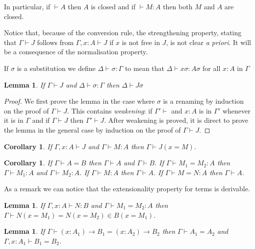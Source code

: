\documentclass[11pt]{article}
\newtheorem{lemma}[theorem]{Lemma}
\newtheorem{corollary}[theorem]{Corollary}
\begin{document}
 In particular, if $\vdash A$ then $A$ is closed and if $\vdash M:A$ then both $M$ and
$A$ are closed.


 Notice that, because of the conversion rule, the strengthening property, stating that
$\Gamma\vdash J$ follows from $\Gamma,x{:}A\vdash J$ if $x$ is not free in $J$, is not
clear {\em a priori}. It will be a consequence of the normalisation property. 


 If $\sigma$ is a substitution we define $\Delta\vdash\sigma:\Gamma$ to mean that $\Delta\vdash x\sigma:A\sigma$ for
all $x{:}A$ in $\Gamma$

\begin{lemma}
If $\Gamma\vdash J$ and $\Delta\vdash\sigma:\Gamma$ then $\Delta\vdash J\sigma$
\end{lemma}

\begin{proof}
We first prove the lemma in the case where $\sigma$ is a renaming by induction on
the proof of $\Gamma\vdash J$.
This contains {\em weakening}: if $\Gamma'\vdash$ and $x{:}A$ is in $\Gamma'$ whenever it is in
$\Gamma$ and if $\Gamma\vdash J$ then $\Gamma'\vdash J$. After weakening is proved, it is
direct to prove the lemma in the general case by induction on
the proof of $\Gamma\vdash J$.
\end{proof}


\begin{corollary}
If $\Gamma,x{:}A\vdash J$ and $\Gamma\vdash M:A$
then $\Gamma\vdash J(x=M)$.
\end{corollary}



\begin{corollary}
If $\Gamma\vdash A=B$ then $\Gamma\vdash A$ and $\Gamma\vdash B$. If $\Gamma\vdash M_1=M_2:A$ then
$\Gamma\vdash M_1:A$ and $\Gamma\vdash M_2:A$. If $\Gamma\vdash M:A$
then $\Gamma\vdash A$. If
$\Gamma\vdash M=N:A$ then $\Gamma\vdash A$.
\end{corollary}

 As a remark we can notice that the extensionality property for terms is derivable.

\begin{lemma}
If $\Gamma,x{:}A\vdash N:B$ and $\Gamma\vdash M_1=M_2:A$ then
$\Gamma\vdash N(x=M_1) = N(x=M_2)\in B(x=M_1)$.
\end{lemma}

\begin{lemma}
If $\Gamma\vdash (x{:}A_1)\rightarrow B_1=(x{:}A_2)\rightarrow B_2$ then $\Gamma\vdash A_1=A_2$
and $\Gamma,x{:}A_1\vdash B_1=B_2$.
\end{lemma}
\end{document}
